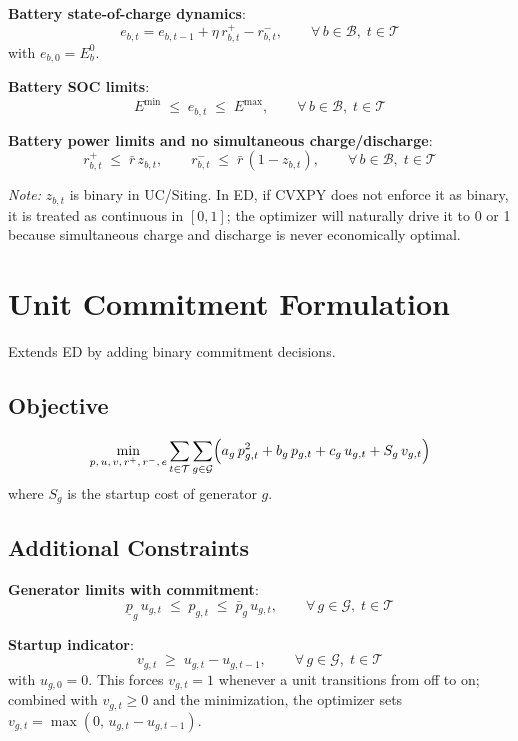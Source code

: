 \documentclass[11pt, letterpaper]{article}
\begin{document}
\textbf{Battery state-of-charge dynamics}:
\[
  e_{b,t} = e_{b,t-1} + \eta\, r^+_{b,t} - r^-_{b,t},
  \qquad \forall\, b \in \mathcal{B},\; t \in \mathcal{T}
\]
with $e_{b,0} = E^0_b$.

\textbf{Battery SOC limits}:
\[
  E^{\min} \;\leq\; e_{b,t} \;\leq\; E^{\max},
  \qquad \forall\, b \in \mathcal{B},\; t \in \mathcal{T}
\]

\textbf{Battery power limits and no simultaneous charge/discharge}:
\[
  r^+_{b,t} \;\leq\; \bar{r}\, z_{b,t},
  \qquad
  r^-_{b,t} \;\leq\; \bar{r}\,(1 - z_{b,t}),
  \qquad \forall\, b \in \mathcal{B},\; t \in \mathcal{T}
\]

\emph{Note:} $z_{b,t}$ is binary in UC/Siting. In ED, if CVXPY does not enforce it
as binary, it is treated as continuous in $[0,1]$; the optimizer will naturally drive
it to 0 or 1 because simultaneous charge and discharge is never economically optimal.

\section{Unit Commitment Formulation}

Extends ED by adding binary commitment decisions.

\subsection{Objective}

\[
  \min_{p,\, u,\, v,\, r^+,\, r^-,\, e}
  \sum_{t \in \mathcal{T}} \sum_{g \in \mathcal{G}}
  \Bigl( a_g\, p_{g,t}^2 + b_g\, p_{g,t} + c_g\, u_{g,t}
         + S_g\, v_{g,t} \Bigr)
\]
where $S_g$ is the startup cost of generator $g$.

\subsection{Additional Constraints}

\textbf{Generator limits with commitment}:
\[
  \underline{p}_g\, u_{g,t} \;\leq\; p_{g,t} \;\leq\; \bar{p}_g\, u_{g,t},
  \qquad \forall\, g \in \mathcal{G},\; t \in \mathcal{T}
\]

\textbf{Startup indicator}:
\[
  v_{g,t} \;\geq\; u_{g,t} - u_{g,t-1},
  \qquad \forall\, g \in \mathcal{G},\; t \in \mathcal{T}
\]
with $u_{g,0} = 0$. This forces $v_{g,t} = 1$ whenever a unit transitions from off
to on; combined with $v_{g,t} \geq 0$ and the minimization, the optimizer sets
$v_{g,t} = \max(0,\, u_{g,t} - u_{g,t-1})$.
\end{document}
